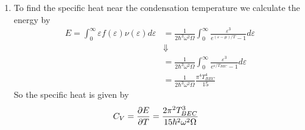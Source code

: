 \documentclass[11pt]{article}
\numberwithin{equation}{section}
\begin{document}
\begin{enumerate}[(1)]
\item To find the specific heat near the condensation temperature we calculate the energy by
\begin{align*}
E = \int_{0}^{\infty}\varepsilon f(\varepsilon)\nu(\varepsilon)d\varepsilon &=  \frac{1}{2\hbar^3\omega^2\Omega}\int_{0}^{\infty}\frac{\varepsilon^3}{e^{(\varepsilon-\mu)/T}-1}d\varepsilon\\
&\Downarrow\\
&=  \frac{1}{2\hbar^3\omega^2\Omega}\int_{0}^{\infty}\frac{\varepsilon^3}{e^{\varepsilon/T_{BEC}}-1}d\varepsilon\\
&=  \frac{1}{2\hbar^3\omega^2\Omega}\frac{\pi^4T_{BEC}^4}{15}
\end{align*}
So the specific heat is given by
\begin{align*}
C_V = \frac{\partial{E}}{\partial{T}} &= \frac{2\pi^2T_{BEC}^3}{15\hbar^2\omega^2\Omega}
\end{align*}



\end{enumerate}
\pagebreak
\end{document}
